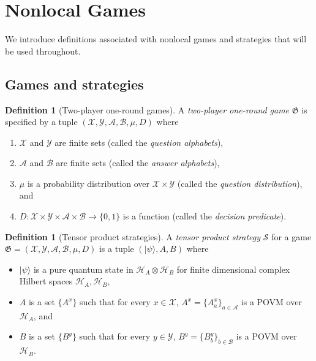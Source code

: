 \documentclass[11pt]{article}
\theoremstyle{definition}
\newtheorem{definition}[theorem]{Definition}
\newcommand{\ket}[1]{|#1\rangle}
\newcommand{\mH}{\ensuremath{\mathcal{H}}}
\newcommand{\game}{\mathfrak{G}}
\newcommand{\strategy}{\mathscr{S}}
\renewcommand{\cal}[1]{\mathcal{#1}}
\begin{document}
\section{Nonlocal Games}
\label{sec:games}

We introduce definitions associated with nonlocal games and strategies that will
be used throughout.

\subsection{Games and strategies}

\begin{definition}[Two-player one-round games]
  \label{def:game}
  A \emph{two-player one-round game} $\game$ is specified by a tuple
  $(\cal{X}, \cal{Y}, \cal{A}, \cal{B}, \mu, D)$ where
  \begin{enumerate}
  \item $\cal{X}$ and $\cal{Y}$ are finite sets (called the \emph{question
      alphabets}),
  \item $\cal{A}$ and $\cal{B}$ are finite sets (called the \emph{answer
      alphabets}),
  \item $\mu$ is a probability distribution over $\cal{X} \times \cal{Y}$
    (called the \emph{question distribution}), and
  \item $D: \cal{X} \times \cal{Y} \times \cal{A} \times \cal{B} \to \{0,1\}$ is
    a function (called the \emph{decision predicate}).
  \end{enumerate}
\end{definition}

\begin{definition}[Tensor product strategies]
  \label{def:tensor-product-strategy}
  A \emph{tensor product strategy} $\strategy$ for a game $\game = (\cal{X},
  \cal{Y}, \cal{A},  \cal{B}, \mu, D)$ is a tuple $(\ket{\psi}, A, B)$ where
  \begin{itemize}
	\item $\ket{\psi}$ is a pure quantum state in $\mH_A \otimes \mH_B$ for finite
    dimensional complex Hilbert spaces $\mH_A, \mH_B$,
	\item $A$ is a set $\{A^x\}$ such that for every $x \in \cal{X}$, $A^x =
    \{A^x_a \}_{a \in \cal{A}}$ is a POVM over $\mH_A$, and
	\item $B$ is a set $\{B^y\}$ such that for every $y \in \cal{Y}$, $B^y =
    \{B^y_b \}_{b \in \cal{B}}$ is a POVM over $\mH_B$.
\end{itemize}
\end{definition}
\end{document}
